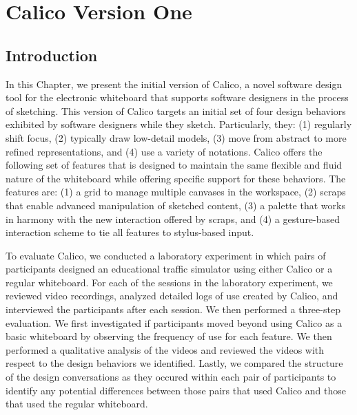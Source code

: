 \chapter{Calico Version One}
\label{chapter:calico-version-one}

\section{Introduction}
\label{intro}

In this Chapter, we present the initial version of Calico, a novel software design tool for the electronic whiteboard that supports software designers in the process of sketching. This version of  Calico targets an initial set of four design behaviors exhibited by software designers while they sketch. Particularly, they: (1) regularly shift focus, (2) typically draw low-detail models, (3) move from abstract to more refined representations, and (4) use a variety of notations. Calico offers the following set of features that is designed to maintain the same flexible and fluid nature of the whiteboard while offering specific support for these behaviors. The features are: (1) a grid to manage multiple canvases in the workspace, (2) scraps that enable advanced manipulation of sketched content, (3) a palette that works in harmony with the new interaction offered by scraps, and (4) a gesture-based interaction scheme to tie all features to stylus-based input. 

To evaluate Calico, we conducted a laboratory experiment in which pairs of participants designed an educational traffic simulator using either Calico or a regular whiteboard. For each of the sessions in the laboratory experiment, we reviewed video recordings, analyzed detailed logs of use created by Calico, and interviewed the participants after each session. We then performed a three-step evaluation. We first investigated if participants moved beyond using Calico as a basic whiteboard by observing the frequency of use for each feature. We then performed a qualitative analysis of the videos and reviewed the videos with respect to the design behaviors we identified. Lastly, we compared the structure of the design conversations as they occured within each pair of participants to identify any potential differences between those pairs that used Calico and those that used the regular whiteboard.

